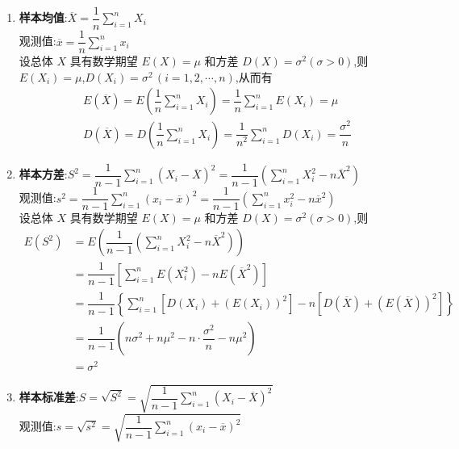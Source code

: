 \begin{enumerate}
    \item \textbf{样本均值}:$\overline{X} = \dfrac{1}{n} \displaystyle\sum_{i=1}^n X_i$ \\[0.5em]
    观测值:$\overline{x} = \dfrac{1}{n} \displaystyle\sum_{i=1}^n x_i$\\[0.5em]
    设总体 $X$ 具有数学期望 $E(X) = \mu$ 和方差 $D(X) = \sigma^2 (\sigma > 0)$,则 $E(X_i) = \mu$,$D(X_i) = \sigma^2 \, (i=1,2,\cdots,n)$,从而有
    $$
    \begin{aligned}
        & E(\overline{X}) = E(\dfrac{1}{n} \sum_{i=1}^n X_i) = \dfrac{1}{n} \sum_{i=1}^n E(X_i) = \mu \\
        & D(\overline{X}) = D(\dfrac{1}{n} \sum_{i=1}^n X_i) = \dfrac{1}{n^2} \sum_{i=1}^n D(X_i) = \dfrac{\sigma^2}{n}
    \end{aligned}
    $$

    \item \textbf{样本方差}:$S^2 = \dfrac{1}{n-1} \displaystyle\sum_{i=1}^n (X_i - \overline{X})^2 = \dfrac{1}{n-1} \left( \displaystyle\sum_{i=1}^n X_i^2 - n \overline{X}^2 \right)$ \\[0.5em]
    观测值:$s^2 = \dfrac{1}{n-1} \displaystyle\sum_{i=1}^n (x_i - \overline{x})^2 = \dfrac{1}{n-1} \left( \displaystyle\sum_{i=1}^n x_i^2 - n \overline{x}^2 \right)$ \\[0.5em]
    设总体 $X$ 具有数学期望 $E(X) = \mu$ 和方差 $D(X) = \sigma^2 (\sigma > 0)$,则
    $$
    \begin{aligned}
        E(S^2) &= E \left( \dfrac{1}{n-1} \left( \displaystyle\sum_{i=1}^n X_i^2 - n \overline{X}^2 \right) \right) \\
        &= \dfrac{1}{n-1} \left[ \displaystyle\sum_{i=1}^n E(X_i^2) - nE(\overline{X}^2) \right] \\
        &= \dfrac{1}{n-1} \left\{ \sum_{i=1}^n [D(X_i) + (E(X_i))^2] - n [D(\overline{X}) + (E(\overline{X}))^2] \right\} \\
        &= \dfrac{1}{n-1} \left( n \sigma^2 + n \mu^2 - n \cdot \dfrac{\sigma^2}{n} - n \mu^2 \right) \\
        &= \sigma^2
    \end{aligned}
    $$

    \item \textbf{样本标准差}:$S = \sqrt{S^2} = \sqrt{\dfrac{1}{n-1} \displaystyle\sum_{i=1}^n (X_i - \overline{X})^2}$ \\[0.5em]
    观测值:$s = \sqrt{s^2} = \sqrt{\dfrac{1}{n-1} \displaystyle\sum_{i=1}^n (x_i - \overline{x})^2}$


\end{enumerate}
